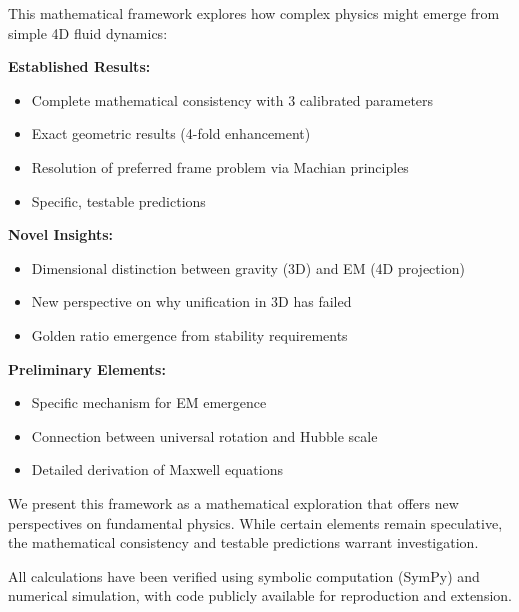 This mathematical framework explores how complex physics might emerge from simple 4D fluid dynamics:

\textbf{Established Results:}
\begin{itemize}
\item Complete mathematical consistency with 3 calibrated parameters
\item Exact geometric results (4-fold enhancement)
\item Resolution of preferred frame problem via Machian principles
\item Specific, testable predictions
\end{itemize}

\textbf{Novel Insights:}
\begin{itemize}
\item Dimensional distinction between gravity (3D) and EM (4D projection)
\item New perspective on why unification in 3D has failed
\item Golden ratio emergence from stability requirements
\end{itemize}

\textbf{Preliminary Elements:}
\begin{itemize}
\item Specific mechanism for EM emergence
\item Connection between universal rotation and Hubble scale
\item Detailed derivation of Maxwell equations
\end{itemize}

We present this framework as a mathematical exploration that offers new perspectives on fundamental physics. While certain elements remain speculative, the mathematical consistency and testable predictions warrant investigation.

All calculations have been verified using symbolic computation (SymPy) and numerical simulation, with code publicly available for reproduction and extension.
